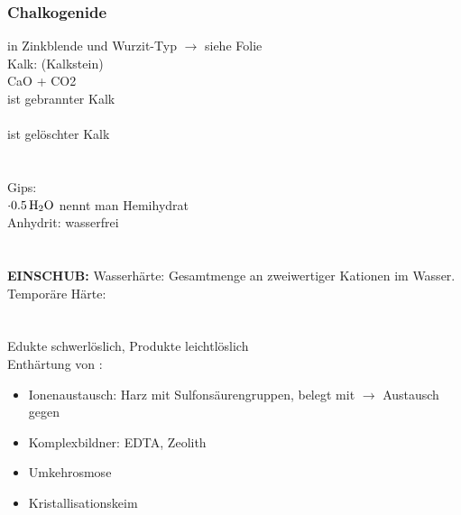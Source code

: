 \documentclass{article}
\begin{document}
\subsubsection{Chalkogenide}
 in Zinkblende und Wurzit-Typ $\rightarrow$ siehe Folie\\
Kalk:  (Kalkstein)\\
 CaO + CO2\\
 ist gebrannter Kalk\\
\\
 ist gelöschter Kalk\\
\\\\
Gips: \\
$\cdot\ce{0.5H2O}$ nennt man Hemihydrat\\
Anhydrit:  wasserfrei\\\\\\

\textbf{EINSCHUB:} Wasserhärte: Gesamtmenge an zweiwertiger Kationen im Wasser.\\
Temporäre Härte:\\
\\
\\
Edukte schwerlöslich, Produkte leichtlöslich\\
Enthärtung von :\\
\begin{itemize}
    \item Ionenaustausch: Harz mit Sulfonsäurengruppen, belegt mit  $\rightarrow$ Austausch gegen 
    \item Komplexbildner: EDTA, Zeolith
    \item Umkehrosmose
    \item Kristallisationskeim
\end{itemize}
\end{document}
